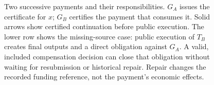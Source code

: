 \begin{figure}[t]
\caption{Two successive payments and their responsibilities. $G_A$ issues the certificate for $x$; $G_B$ certifies the payment that consumes it. Solid arrows show certified continuation before public execution. The lower row shows the missing-source case: public execution of $T_B$ creates final outputs and a direct obligation against $G_A$. A valid, included compensation decision can close that obligation without waiting for resubmission or historical repair. Repair changes the recorded funding reference, not the payment's economic effects.}
\label{fig:architecture}
\end{figure}
